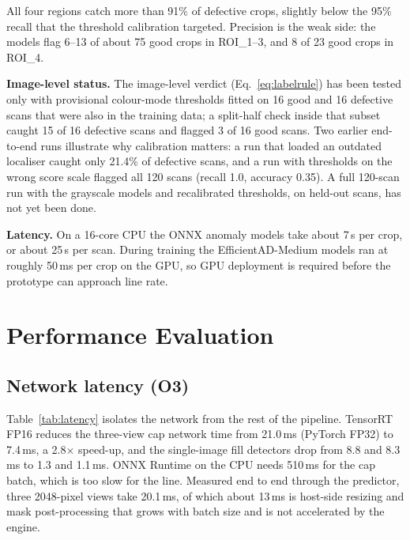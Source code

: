 All four regions catch more than 91\% of defective crops, slightly below the 95\% recall that the threshold calibration targeted. Precision is the weak side: the models flag 6--13 of about 75 good crops in ROI\_1--3, and 8 of 23 good crops in ROI\_4.

\noindent\textbf{Image-level status.} The image-level verdict (Eq.~\eqref{eq:labelrule}) has been tested only with provisional colour-mode thresholds fitted on 16 good and 16 defective scans that were also in the training data; a split-half check inside that subset caught 15 of 16 defective scans and flagged 3 of 16 good scans. Two earlier end-to-end runs illustrate why calibration matters: a run that loaded an outdated localiser caught only 21.4\% of defective scans, and a run with thresholds on the wrong score scale flagged all 120 scans (recall 1.0, accuracy 0.35). A full 120-scan run with the grayscale models and recalibrated thresholds, on held-out scans, has not yet been done.

\noindent\textbf{Latency.} On a 16-core CPU the ONNX anomaly models take about 7\,s per crop, or about 25\,s per scan. During training the EfficientAD-Medium models ran at roughly 50\,ms per crop on the GPU, so GPU deployment is required before the prototype can approach line rate.

\section{Performance Evaluation}
\label{sec:performance-evaluation}

\subsection{Network latency (O3)}
Table~\ref{tab:latency} isolates the network from the rest of the pipeline. TensorRT FP16 reduces the three-view cap network time from 21.0\,ms (PyTorch FP32) to 7.4\,ms, a 2.8$\times$ speed-up, and the single-image fill detectors drop from 8.8 and 8.3\,ms to 1.3 and 1.1\,ms. ONNX Runtime on the CPU needs 510\,ms for the cap batch, which is too slow for the line. Measured end to end through the predictor, three 2048-pixel views take 20.1\,ms, of which about 13\,ms is host-side resizing and mask post-processing that grows with batch size and is not accelerated by the engine.


